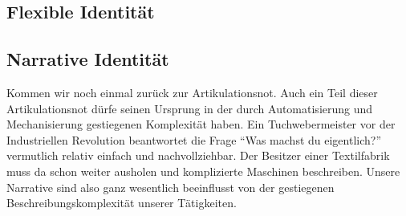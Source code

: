 \subsection{Flexible Identität}


\subsection{Narrative Identität}

Kommen wir noch einmal zurück zur Artikulationsnot. Auch ein Teil dieser Artikulationsnot dürfe seinen Ursprung in der durch Automatisierung und Mechanisierung gestiegenen Komplexität haben.
Ein Tuchwebermeister vor der Industriellen Revolution beantwortet die Frage \enquote{Was machst du eigentlich?} vermutlich relativ einfach und nachvollziehbar.
Der Besitzer einer Textilfabrik muss da schon weiter ausholen und komplizierte Maschinen beschreiben.
Unsere Narrative sind also ganz wesentlich beeinflusst von der gestiegenen Beschreibungskomplexität unserer Tätigkeiten.
